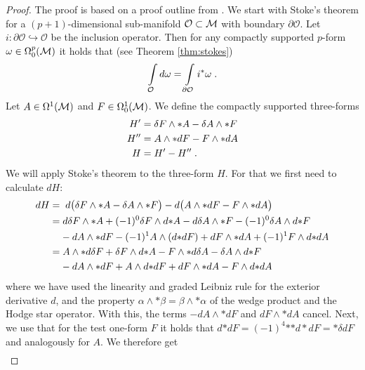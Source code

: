 \begin{proof}
 The proof is based on a proof outline from \cite[Appendix A]{FURLANI}. We start with Stoke's theorem for a $(p+1)$-dimensional sub-manifold $\mathcal{O} \subset \mathcal{M}$ with boundary $\partial \mathcal O$. Let $i : \partial\mathcal{O} \hookrightarrow \mathcal{O}$ be the inclusion operator. Then for any compactly supported $p$-form $\omega \in \Omega^p_0 (\mathcal{M})$ it holds that (see Theorem \ref{thm:stokes})
 \begin{align}
  \int \limits_\mathcal O d\omega = \int \limits_{\partial \mathcal O} i^* \omega \;.
  \end{align}
Let $A \in \Omega^1(\mathcal{M})$ and $F \in \Omega_0^1 (\mathcal{M})$. We  define the compactly supported three-forms
\begin{subequations}
\begin{align}
 H' &= \delta F \wedge *A - \delta A \wedge *F \\
 H'' &= A \wedge * dF - F \wedge *dA \\
 H &=  H' -  H'' \;.
\end{align}
\end{subequations}
We will apply Stoke's theorem to the three-form $H$. For that we first need to calculate $dH$:
\begin{align}
 dH &=\; d\big( \delta F \wedge *A - \delta A \wedge *F \big) - d \big(A \wedge * dF - F \wedge *dA \big)  \notag \\
  &= d\delta F \wedge *A + (-1)^0 \delta F \wedge d{*A} - d\delta A \wedge *F - (-1)^0 \delta A \wedge d{*F} \notag \notag \\
   &\phantom{M}- dA \wedge *dF - (-1)^1 A \wedge (d{*{dF}}) + dF \wedge *{dA} + (-1)^1 F \wedge d{*{d A}} \notag \\
  &= A \wedge *d\delta F + \delta F \wedge d {* A} - F \wedge *{d\delta A} - \delta A \wedge d {* F }\notag \notag \\
   &\phantom{M}- {dA \wedge *dF} + A \wedge d{*{d F}}  + {dF \wedge * {dA}} -F \wedge d{*{dA }}
\end{align}
where we have used the linearity and graded Leibniz rule for the exterior derivative $d$, and the property $\alpha \wedge * \beta = \beta \wedge * \alpha$ of the wedge product and the Hodge star operator. With this, the terms $-{dA \wedge *dF}$ and ${dF \wedge * {dA}}$ cancel. Next, we use that for the test one-form $F$ it holds that $d{*dF} = (-1)^4 {*{*{d*}}} dF =  *\delta d F$ and analogously for $A$. We therefore get
\begin{align}

\end{align}
\end{proof}
